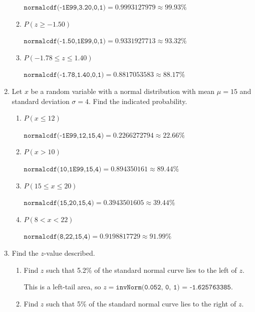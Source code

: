 \documentclass{article}
\newcommand{\answer}[1]{\color{red}#1}
\begin{document}
\begin{enumerate}
\begin{enumerate}
	{\answer $\texttt{normalcdf(-1E99,3.20,0,1)} = 0.9993127979 \approx 99.93\%$
	} 
	
	\item $P(z \geq -1.50)$ 
	
	{\answer  $\texttt{normalcdf(-1.50,1E99,0,1)} = 0.9331927713 \approx 93.32\%$
	} 
	
	\item $P(-1.78 \leq z \leq 1.40)$ 
	
	{\answer  $\texttt{normalcdf(-1.78,1.40,0,1)} = 0.8817053583 \approx 88.17\%$
	} 
	\end{enumerate}


\item Let $x$ be a random variable with a normal distribution with mean $\mu = 15$ and standard deviation $\sigma = 4$.  Find the indicated probability.

	\begin{enumerate}
	\item $P(x \leq 12)$ 
	
	{\answer $\texttt{normalcdf(-1E99,12,15,4)} =  0.2266272794 \approx 22.66\%$
	} 
	
	\item $P(x > 10)$ 
	
	{\answer $\texttt{normalcdf(10,1E99,15,4)} =  0.894350161 \approx 89.44\%$
	} 
	
	\item $P(15 \leq x \leq 20)$ 
	
	{\answer $\texttt{normalcdf(15,20,15,4)} =  0.3943501605 \approx 39.44\%$
	} 
	
	\item $P(8 < x < 22)$ 
	
	{\answer $\texttt{normalcdf(8,22,15,4)} =  0.9198817729 \approx 91.99\%$
	} 
	\end{enumerate}

\item Find the $z$-value described.

	\begin{enumerate}
	
	\item Find $z$ such that 5.2\% of the standard normal curve lies to the left of $z$.  
	
	{\answer This is a left-tail area, so $z = \texttt{invNorm(0.052, 0, 1) = -1.625763385}$.
	} 

	\item Find $z$ such that 5\% of the standard normal curve lies to the right of $z$.  
	

\end{enumerate}
\end{enumerate}
\end{document}
